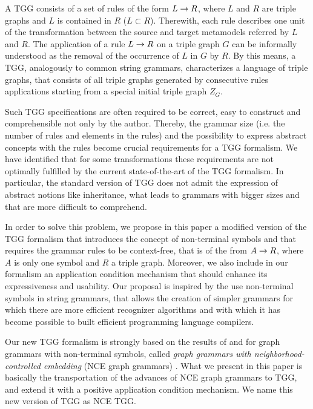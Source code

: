 \documentclass[a4paper,twoside]{article}
\begin{document}
A TGG consists of a set of rules of the form $L \to R$, where $L$ and $R$ are triple graphs and $L$ is contained in $R$ ($L \subset R$). Therewith, each rule describes one unit of the transformation between the source and target metamodels referred by $L$ and $R$. The application of a rule $L \to R$ on a triple graph $G$ can be informally understood as the removal of the occurrence of $L$ in $G$ by $R$. By this means, a TGG, analogously to common string grammars, characterizes a language of triple graphs, that consists of all triple graphs generated by consecutive rules applications starting from a special initial triple graph $Z_G$.

Such TGG specifications are often required to be correct, easy to construct and comprehensible not only by the author. Thereby, the grammar size (i.e. the number of rules and elements in the rules) and the possibility to express abstract concepts with the rules become crucial requirements for a TGG formalism. We have identified that for some transformations these requirements are not optimally fulfilled by the current state-of-the-art of the TGG formalism. In particular, the standard version of TGG does not admit the expression of abstract notions like inheritance, what leads to grammars with bigger sizes and that are more difficult to comprehend.

In order to solve this problem, we propose in this paper a modified version of the TGG formalism that introduces the concept of non-terminal symbols and that requires the grammar rules to be context-free, that is of the from $A \to R$, where $A$ is only one symbol and $R$ a triple graph. Moreover, we also include in our formalism an application condition mechanism that should enhance its expressiveness and usability. Our proposal is inspired by the use non-terminal symbols in string grammars, that allows the creation of simpler grammars for which there are more efficient recognizer algorithms and with which it has become possible to built efficient programming language compilers.

Our new TGG formalism is strongly based on the results of \cite{rozenberg1986boundary} and \cite{janssens1982graph} for graph grammars with non-terminal symbols, called \textit{graph grammars with neighborhood-controlled embedding} (NCE graph grammars) . What we present in this paper is basically the transportation of the advances of NCE graph grammars to TGG, and extend it with a positive application condition mechanism. We name this new version of TGG as NCE TGG.
\end{document}
